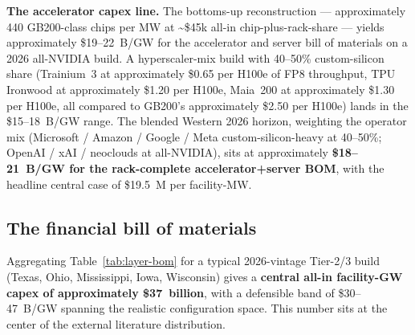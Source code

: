 \textbf{The accelerator capex line.} The bottoms-up reconstruction --- approximately 440 GB200-class chips per MW at \textasciitilde\$45k all-in chip-plus-rack-share --- yields approximately \$19--22~B/GW for the accelerator and server bill of materials on a 2026 all-NVIDIA build. A hyperscaler-mix build with 40--50\% custom-silicon share (Trainium~3 at approximately \$0.65 per H100e of FP8 throughput, TPU Ironwood at approximately \$1.20 per H100e, Maia~200 at approximately \$1.30 per H100e, all compared to GB200's approximately \$2.50 per H100e) lands in the \$15--18~B/GW range. The blended Western 2026 horizon, weighting the operator mix (Microsoft / Amazon / Google / Meta custom-silicon-heavy at 40--50\%; OpenAI / xAI / neoclouds at all-NVIDIA), sits at approximately \textbf{\$18--21~B/GW for the rack-complete accelerator+server BOM}, with the headline central case of \$19.5~M per facility-MW.

\subsection{The financial bill of materials}
\label{subsec:financial-bom}

Aggregating Table~\ref{tab:layer-bom} for a typical 2026-vintage Tier-2/3 build (Texas, Ohio, Mississippi, Iowa, Wisconsin) gives a \textbf{central all-in facility-GW capex of approximately \$37~billion}, with a defensible band of \$30--47~B/GW spanning the realistic configuration space. This number sits at the center of the external literature distribution.

